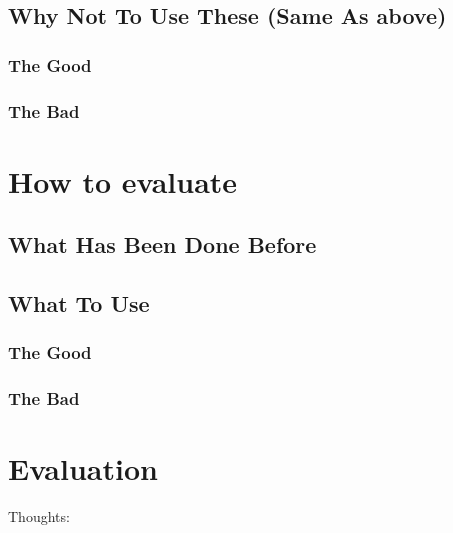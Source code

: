 \subsection{Why Not To Use These (Same As above)}
\subsubsection{The Good}
\subsubsection{The Bad}

\section{How to evaluate}
\subsection{What Has Been Done Before}
\subsection{What To Use}
\subsubsection{The Good}
\subsubsection{The Bad}

\section{Evaluation}



Thoughts:

